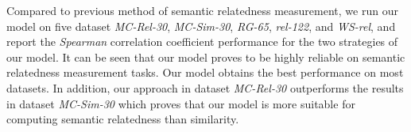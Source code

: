 \begin{table}[H]
    \centering
    \caption{Spearman correlation performance on five word similarity and relatedness datasets}
    \label{spearman}
    \renewcommand\arraystretch{1.15}
\end{table}

Compared to previous method of semantic relatedness measurement, we run our model on five dataset
\emph{MC-Rel-30}, \emph{MC-Sim-30}, \emph{RG-65}, \emph{rel-122}, and \emph{WS-rel}, and report the
\emph{Spearman} correlation coefficient performance for the two strategies of our model. It can be
seen that our model proves to be highly reliable on semantic relatedness measurement tasks. Our model obtains
the best performance on most datasets. In addition, our approach in dataset \emph{MC-Rel-30} outperforms
the results in dataset \emph{MC-Sim-30} which proves that our model is more suitable for computing semantic
relatedness than similarity. 